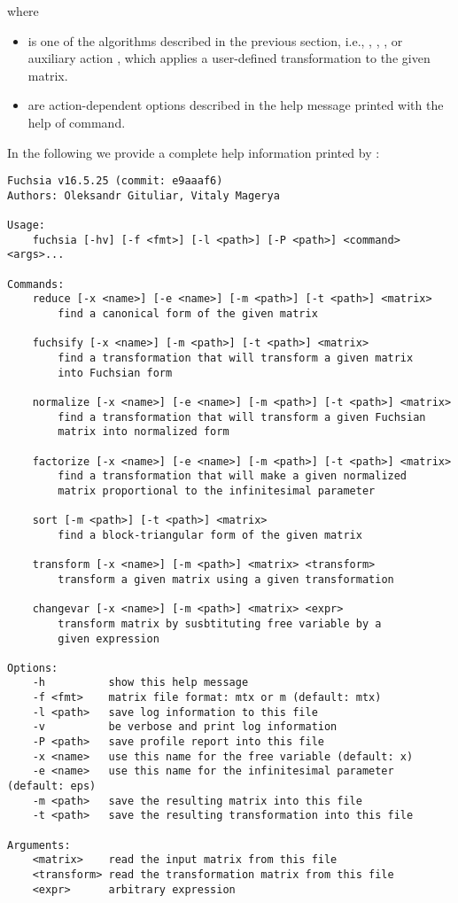 \documentclass[12pt,a4paper]{article}
\begin{document}
where
\begin{itemize}
  \item {} is one of the algorithms described in the previous section, i.e., , , , or auxiliary action , which applies a user-defined transformation to the given matrix.
  \item {} are action-dependent options described in the help message printed with the help of  command.
\end{itemize}

In the following we provide a complete help information printed by :
{\small
\begin{verbatim}
Fuchsia v16.5.25 (commit: e9aaaf6)
Authors: Oleksandr Gituliar, Vitaly Magerya

Usage:
    fuchsia [-hv] [-f <fmt>] [-l <path>] [-P <path>] <command> <args>...

Commands:
    reduce [-x <name>] [-e <name>] [-m <path>] [-t <path>] <matrix>
        find a canonical form of the given matrix

    fuchsify [-x <name>] [-m <path>] [-t <path>] <matrix>
        find a transformation that will transform a given matrix
        into Fuchsian form

    normalize [-x <name>] [-e <name>] [-m <path>] [-t <path>] <matrix>
        find a transformation that will transform a given Fuchsian
        matrix into normalized form

    factorize [-x <name>] [-e <name>] [-m <path>] [-t <path>] <matrix>
        find a transformation that will make a given normalized
        matrix proportional to the infinitesimal parameter

    sort [-m <path>] [-t <path>] <matrix>
        find a block-triangular form of the given matrix

    transform [-x <name>] [-m <path>] <matrix> <transform>
        transform a given matrix using a given transformation

    changevar [-x <name>] [-m <path>] <matrix> <expr>
        transform matrix by susbtituting free variable by a
        given expression

Options:
    -h          show this help message
    -f <fmt>    matrix file format: mtx or m (default: mtx)
    -l <path>   save log information to this file
    -v          be verbose and print log information
    -P <path>   save profile report into this file
    -x <name>   use this name for the free variable (default: x)
    -e <name>   use this name for the infinitesimal parameter (default: eps)
    -m <path>   save the resulting matrix into this file
    -t <path>   save the resulting transformation into this file

Arguments:
    <matrix>    read the input matrix from this file
    <transform> read the transformation matrix from this file
    <expr>      arbitrary expression
\end{verbatim}}
\end{document}
